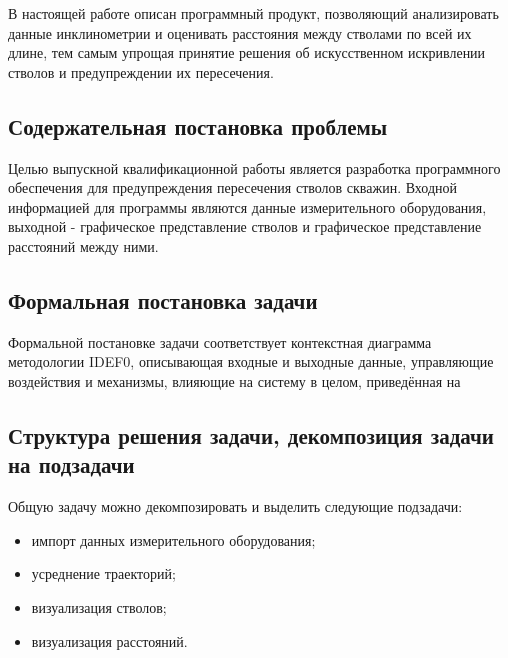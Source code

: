 В настоящей работе описан программный продукт, позволяющий анализировать данные инклинометрии и оценивать расстояния между стволами по всей их длине, тем
самым упрощая принятие решения об искусственном искривлении стволов и предупреждении их пересечения.


\subsection{Содержательная постановка проблемы}
Целью выпускной квалификационной работы является разработка программного обеспечения для предупреждения пересечения стволов скважин. Входной информацией для
программы являются данные измерительного оборудования, выходной - графическое представление стволов и графическое представление расстояний между ними.


\subsection{Формальная постановка задачи}
Формальной постановке задачи соответствует контекстная диаграмма методологии IDEF0, описывающая входные и выходные данные, управляющие воздействия и механизмы,
влияющие на систему в целом, приведённая на 

\subsection{Структура решения задачи, декомпозиция задачи на подзадачи}
Общую задачу можно декомпозировать и выделить следующие подзадачи:
\begin{itemize}
  \item импорт данных измерительного оборудования;
  \item усреднение траекторий;
  \item визуализация стволов;
  \item визуализация расстояний.
\end{itemize}

